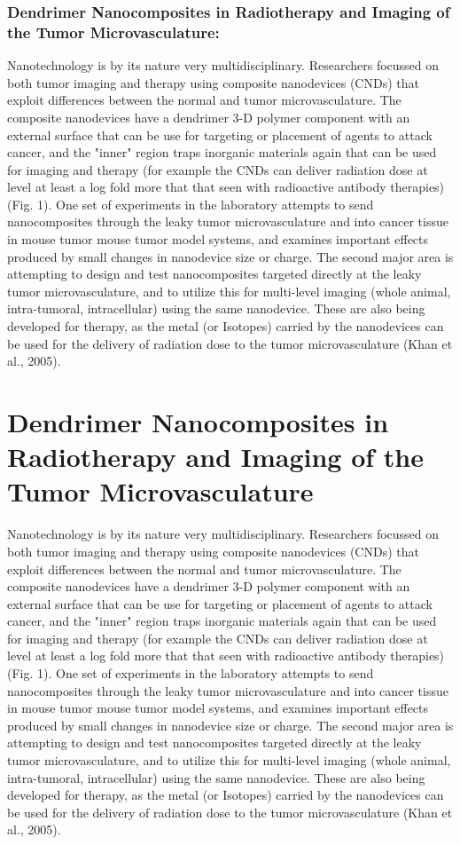 \documentclass{article}
\begin{document}
\begin{multicols}
\subsubsection{Dendrimer Nanocomposites in Radiotherapy and Imaging of the Tumor Microvasculature:}Nanotechnology is by its nature very multidisciplinary. Researchers focussed on both tumor imaging and therapy using composite nanodevices (CNDs) that exploit differences between the normal and tumor microvasculature. The composite nanodevices have a dendrimer 3-D polymer
component with an external surface that can
be use for targeting or placement of agents
to attack cancer, and the "inner" region traps inorganic materials again that can be used for imaging and therapy (for example the CNDs can deliver radiation dose at level at least a log fold more that that seen with radioactive antibody therapies) (Fig. 1). One set of experiments in the laboratory attempts to send nanocomposites through the leaky tumor microvasculature and into cancer tissue in mouse tumor mouse tumor model systems, and examines important effects produced by small changes in nanodevice size or charge. The second major area is attempting to design and test nanocomposites targeted directly at the leaky tumor microvasculature, and to utilize this for multi-level imaging (whole animal, intra-tumoral, intracellular) using the same nanodevice. These are also being developed for therapy, as the metal (or Isotopes) carried by the nanodevices can be
used for the delivery of radiation dose to the
tumor microvasculature (Khan et al., 2005).

\section{Dendrimer Nanocomposites in Radiotherapy and Imaging of the Tumor Microvasculature}Nanotechnology is by its nature very multidisciplinary. Researchers focussed on both tumor imaging and therapy using composite nanodevices (CNDs) that exploit differences between the normal and tumor microvasculature. The composite nanodevices have a dendrimer 3-D polymer
component with an external surface that can
be use for targeting or placement of agents
to attack cancer, and the "inner" region traps inorganic materials again that can be used for imaging and therapy (for example the CNDs can deliver radiation dose at level at least a log fold more that that seen with radioactive antibody therapies) (Fig. 1). One set of experiments in the laboratory attempts to send nanocomposites through the leaky tumor microvasculature and into cancer tissue in mouse tumor mouse tumor model systems, and examines important effects produced by small changes in nanodevice size or charge. The second major area is attempting to design and test nanocomposites targeted directly at the leaky tumor microvasculature, and to utilize this for multi-level imaging (whole animal, intra-tumoral, intracellular) using the same nanodevice. These are also being developed for therapy, as the metal (or Isotopes) carried by the nanodevices can be
used for the delivery of radiation dose to the
tumor microvasculature (Khan et al., 2005).


\end{multicols}
\end{document}
